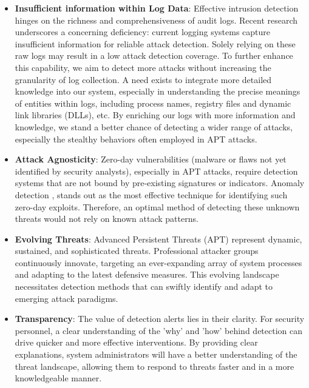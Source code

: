 \begin{itemize}
    \item \textbf{Insufficient information within Log Data}: Effective intrusion detection hinges on the richness and comprehensiveness of audit logs. Recent research \cite{gandhi2023rethinking} underscores a concerning deficiency: current logging systems capture insufficient information for reliable attack detection. Solely relying on these raw logs may result in a low attack detection coverage. To further enhance this capability, we aim to detect more attacks without increasing the granularity of log collection. A need exists to integrate more detailed knowledge into our system, especially in understanding the precise meanings of entities within logs, including process names, registry files and dynamic link libraries (DLLs), etc. By enriching our logs with more information and knowledge, we stand a better chance of detecting a wider range of attacks, especially the stealthy behaviors often employed in APT attacks.
    \item \textbf{Attack Agnosticity}: 
    Zero-day vulnerabilities (malware or flaws not yet identified by security analysts), especially in APT attacks, require detection systems that are not bound by pre-existing signatures or indicators. Anomaly detection \cite{wang2020you, alsaheel2021atlas, han2020unicorn}, stands out as the most effective technique for identifying such zero-day exploits. Therefore, an optimal method of detecting these unknown threats would not rely on known attack patterns.
    \item \textbf{Evolving Threats}: Advanced Persistent Threats (APT) represent dynamic, sustained, and sophisticated threats. Professional attacker groups continuously innovate, targeting an ever-expanding array of system processes and adapting to the latest defensive measures. This evolving landscape necessitates detection methods that can swiftly identify and adapt to emerging attack paradigms.
    \item \textbf{Transparency}: The value of detection alerts lies in their clarity. For security personnel, a clear understanding of the 'why' and 'how' behind detection can drive quicker and more effective interventions. By providing clear explanations, system administrators will have a better understanding of the threat landscape, allowing them to respond to threats faster and in a more knowledgeable manner.
\end{itemize}

